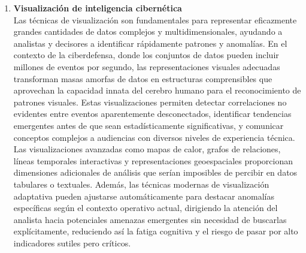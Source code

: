 \begin{enumerate}
\item \textbf{Visualización de inteligencia cibernética} \\
Las técnicas de visualización son fundamentales para representar eficazmente grandes cantidades de datos complejos y multidimensionales, ayudando a analistas y decisores a identificar rápidamente patrones y anomalías. En el contexto de la ciberdefensa, donde los conjuntos de datos pueden incluir millones de eventos por segundo, las representaciones visuales adecuadas transforman masas amorfas de datos en estructuras comprensibles que aprovechan la capacidad innata del cerebro humano para el reconocimiento de patrones visuales. Estas visualizaciones permiten detectar correlaciones no evidentes entre eventos aparentemente desconectados, identificar tendencias emergentes antes de que sean estadísticamente significativas, y comunicar conceptos complejos a audiencias con diversos niveles de experiencia técnica. Las visualizaciones avanzadas como mapas de calor, grafos de relaciones, líneas temporales interactivas y representaciones geoespaciales proporcionan dimensiones adicionales de análisis que serían imposibles de percibir en datos tabulares o textuales. Además, las técnicas modernas de visualización adaptativa pueden ajustarse automáticamente para destacar anomalías específicas según el contexto operativo actual, dirigiendo la atención del analista hacia potenciales amenazas emergentes sin necesidad de buscarlas explícitamente, reduciendo así la fatiga cognitiva y el riesgo de pasar por alto indicadores sutiles pero críticos.
\end{enumerate}

